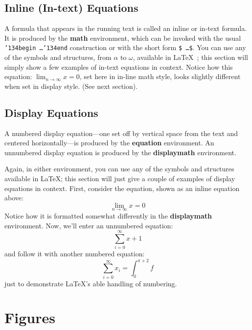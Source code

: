 \documentclass[sigconf]{acmart}
\begin{document}
\subsection{Inline (In-text) Equations}
A formula that appears in the running text is called an inline or
in-text formula.  It is produced by the \textbf{math} environment,
which can be invoked with the usual
\texttt{{\char'134}begin\,\ldots{\char'134}end} construction or with
the short form \texttt{\$\,\ldots\$}. You can use any of the symbols
and structures, from $\alpha$ to $\omega$, available in
\LaTeX~\cite{Lamport:LaTeX}; this section will simply show a few
examples of in-text equations in context. Notice how this equation:
\begin{math}
  \lim_{n\rightarrow \infty}x=0
\end{math},
set here in in-line math style, looks slightly different when
set in display style.  (See next section).

\subsection{Display Equations}
A numbered display equation---one set off by vertical space from the
text and centered horizontally---is produced by the \textbf{equation}
environment. An unnumbered display equation is produced by the
\textbf{displaymath} environment.

Again, in either environment, you can use any of the symbols and
structures available in \LaTeX\@; this section will just give a couple
of examples of display equations in context.  First, consider the
equation, shown as an inline equation above:
\begin{equation}
  \lim_{n\rightarrow \infty}x=0
\end{equation}
Notice how it is formatted somewhat differently in
the \textbf{displaymath}
environment.  Now, we'll enter an unnumbered equation:
\begin{displaymath}
  \sum_{i=0}^{\infty} x + 1
\end{displaymath}
and follow it with another numbered equation:
\begin{equation}
  \sum_{i=0}^{\infty}x_i=\int_{0}^{\pi+2} f
\end{equation}
just to demonstrate \LaTeX's able handling of numbering.

\section{Figures}
\end{document}
